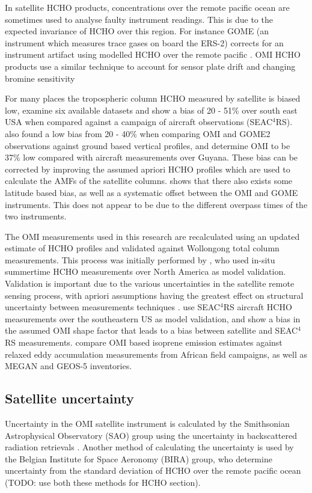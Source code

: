     In satellite HCHO products, concentrations over the remote pacific ocean are sometimes used to analyse faulty instrument readings.
    This is due to the expected invariance of HCHO over this region.
    For instance GOME (an instrument which measures trace gases on board the ERS-2) corrects for an instrument artifact using modelled HCHO over the remote pacific \citep{Shim2015}.
    OMI HCHO products use a similar technique to account for sensor plate drift and changing bromine sensitivity \citep{Abad2015}
    
    For many places the tropospheric column HCHO measured by satellite is biased low, \citet{Zhu2016} examine six available datasets and show a bias of 20 - 51\% over south east USA when compared against a campaign of aircraft observations (SEAC$^4$RS).
    \citet{DeSmedt2015} also found a low bias from 20 - 40\% when comparing OMI and GOME2 observations against ground based vertical profiles, and \citet{Barkley2013} determine OMI to be 37\% low compared with aircraft measurements over Guyana.
    These bias can be corrected by improving the assumed apriori HCHO profiles which are used to calculate the AMFs of the satellite columns.
    \cite{Millet2008} shows that there also exists some latitude based bias, as well as a systematic offset between the OMI and GOME instruments.
    This does not appear to be due to the different overpass times of the two instruments.
    
    The OMI measurements used in this research are recalculated using an updated estimate of HCHO profiles and validated against Wollongong total column measurements. 
    This process was initially performed by \cite{Palmer2003}, who used in-situ summertime HCHO measurements over North America as model validation.
    Validation is important due to the various uncertainties in the satellite remote sensing process, with apriori assumptions having the greatest effect on structural uncertainty between measurements techniques \citet{Lorente2017}.
    \cite{Zhu2016} use SEAC$^4$RS aircraft HCHO measurements over the southeastern US as model validation, and show a bias in the assumed OMI shape factor that leads to a bias between satellite and SEAC$^4$RS measurements.
    \cite{Marais2014} compare OMI based isoprene emission estimates against relaxed eddy accumulation measurements from African field campaigns, as well as MEGAN and GEOS-5 inventories.
    
  \subsection{Satellite uncertainty}
    Uncertainty in the OMI satellite instrument is calculated by the Smithsonian Astrophysical Observatory (SAO) group using the uncertainty in backscattered radiation retrievals \citep{Abad2015, Abad2016}.
    Another method of calculating the uncertainty is used by the Belgian Institute for Space Aeronomy (BIRA) group, who determine uncertainty from the standard deviation of HCHO over the remote pacific ocean (TODO: use both these methods for HCHO section)\citep{DeSmedt2012, DeSmedt2015}.
    

